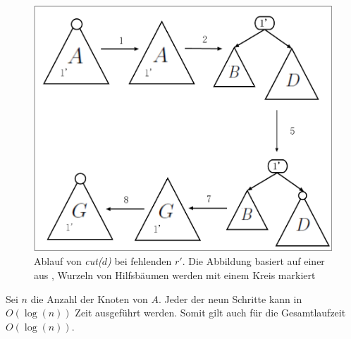 \documentclass[a4paper,12pt]{article}
\begin{document}
\begin{figure}[H]
	\centering
	\includegraphics[width=1\textwidth]{"Medien/Tango/cut2"}
	\caption{Ablauf von \textit{cut($d$)} bei fehlenden $r'$. Die Abbildung basiert auf einer aus \cite{demainDinamicOpti}, Wurzeln von Hilfsbäumen werden mit einem Kreis markiert }
	\label{fig:cut2}
\end{figure}
Sei $n$ die Anzahl der Knoten von $A$. Jeder der neun Schritte kann in $O\left(\log \left(n\right)\right)$ Zeit ausgeführt werden. Somit gilt auch für die Gesamtlaufzeit $O\left(\log \left(n\right)\right)$.
\end{document}
